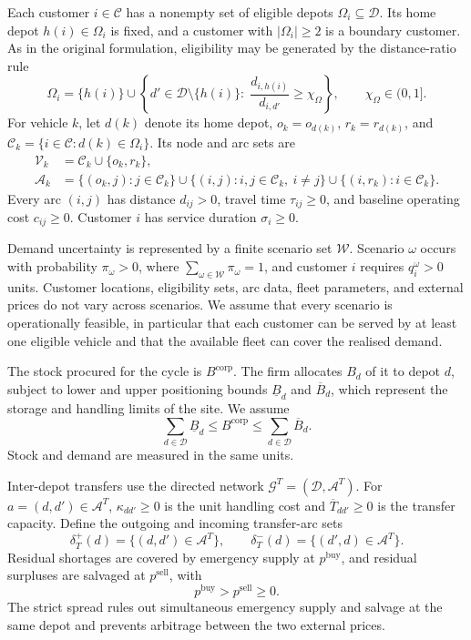 \documentclass[authoryear,final,3p,times]{elsarticle}
\theoremstyle{definition}
\theoremstyle{plain}
\begin{document}
Each customer $i\in\mathcal C$ has a nonempty set of eligible depots
$\Omega_i\subseteq\mathcal D$.  Its home depot $h(i)\in\Omega_i$ is fixed,
and a customer with $|\Omega_i|\ge2$ is a boundary customer.  As in the
original formulation, eligibility may be generated by the distance-ratio rule
\begin{equation}
\Omega_i=\{h(i)\}\cup
\left\{d'\in\mathcal D\setminus\{h(i)\}:\;
\frac{d_{i,h(i)}}{d_{i,d'}}\ge\chi_\Omega\right\},
\qquad \chi_\Omega\in(0,1].
\label{eq:depot_flexibility}
\end{equation}
For vehicle $k$, let $d(k)$ denote its home depot,
$o_k=o_{d(k)}$, $r_k=r_{d(k)}$, and
$\mathcal C_k=\{i\in\mathcal C:d(k)\in\Omega_i\}$.  Its node and arc sets are
\begin{align*}
\mathcal V_k&=\mathcal C_k\cup\{o_k,r_k\},\\
\mathcal A_k&=\{(o_k,j):j\in\mathcal C_k\}
\cup\{(i,j):i,j\in\mathcal C_k,\ i\ne j\}
\cup\{(i,r_k):i\in\mathcal C_k\}.
\end{align*}
Every arc $(i,j)$ has distance $d_{ij}>0$, travel time $\tau_{ij}\ge0$, and
baseline operating cost $c_{ij}\ge0$.  Customer $i$ has service duration
$\sigma_i\ge0$.

Demand uncertainty is represented by a finite scenario set $\mathcal W$.
Scenario $\omega$ occurs with probability $\pi_\omega>0$, where
$\sum_{\omega\in\mathcal W}\pi_\omega=1$, and customer $i$ requires
$q_i^\omega>0$ units.  Customer locations, eligibility sets, arc data, fleet
parameters, and external prices do not vary across scenarios.  We assume
that every scenario is operationally feasible, in particular that each
customer can be served by at least one eligible vehicle and that the available
fleet can cover the realised demand.

The stock procured for the cycle is $B^{\mathrm{corp}}$.  The firm allocates
$B_d$ of it to depot $d$, subject to lower and upper positioning bounds
$\underline B_d$ and $\overline B_d$, which represent the storage and handling
limits of the site.  We assume
\begin{equation*}
\sum_{d\in\mathcal D}\underline B_d
\le B^{\mathrm{corp}}
\le\sum_{d\in\mathcal D}\overline B_d.
\end{equation*}
Stock and demand are measured in the same units.

Inter-depot transfers use the directed network
$\mathcal G^T=(\mathcal D,\mathcal A^T)$.  For
$a=(d,d')\in\mathcal A^T$, $\kappa_{dd'}\ge0$ is the unit handling cost
and $\overline T_{dd'}\ge0$ is the transfer capacity.  Define the outgoing and
incoming transfer-arc sets
\begin{equation*}
\delta_T^+(d)=\{(d,d')\in\mathcal A^T\},
\qquad
\delta_T^-(d)=\{(d',d)\in\mathcal A^T\}.
\end{equation*}
Residual shortages are covered by emergency supply at $p^{\mathrm{buy}}$, and
residual surpluses are salvaged at $p^{\mathrm{sell}}$, with
\begin{equation}
p^{\mathrm{buy}}>p^{\mathrm{sell}}\ge0.
\label{eq:market_spread}
\end{equation}
The strict spread rules out simultaneous emergency supply and salvage at the
same depot and prevents arbitrage between the two external prices.
\end{document}
